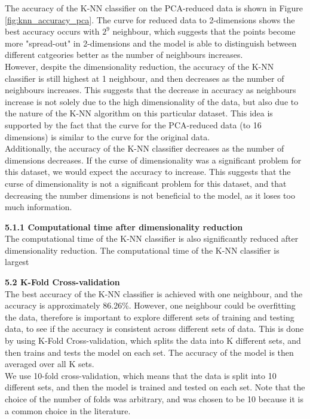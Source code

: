 \documentclass[12pt]{article}
\begin{document}
The accuracy of the K-NN classifier on the PCA-reduced data is shown in Figure \ref{fig:knn_accuracy_pca}. 
The curve for reduced data to 2-dimensions shows the best accuracy occurs with $2^9$ neighbour, which suggests that the points become more "spread-out" in 2-dimensions and the model is able to distinguish between different catgeories better as the number of neighbours increases. 
\\
However, despite the dimensionality reduction, the accuracy of the K-NN classifier is still highest at 1 neighbour, and then decreases as the number of neighbours increases. This suggests that the decrease in accuracy as neighbours increase is not solely due to the high dimensionality of the data, but also due to the nature of the K-NN algorithm on this particular dataset. This idea is supported by the fact that the curve for the PCA-reduced data (to 16 dimensions) is similar to the curve for the original data. 
\\
Additionally, the accuracy of the K-NN classifier decreases as the number of dimensions decreases. If the curse of dimensionality was a significant problem for this dataset, we would expect the accuracy to increase. This suggests that the curse of dimensionality is not a significant problem for this dataset, and that decreasing the number dimensions is not beneficial to the model, as it loses too much information.

\textbf{5.1.1 Computational time after dimensionality reduction}
\\
The computational time of the K-NN classifier is also significantly reduced after dimensionality reduction. The computational time of the K-NN classifier is largest

\vspace{20pt}

\textbf{5.2 K-Fold Cross-validation}
\\ 
The best accuracy of the K-NN classifier is achieved with one neighbour, and the accuracy is approximately 86.26\%. However, one neighbour could be overfitting the data, therefore is important to explore different sets of training and testing data, to see if the accuracy is consistent across different sets of data. This is done by using K-Fold Cross-validation, which splits the data into K different sets, and then trains and tests the model on each set. The accuracy of the model is then averaged over all K sets. 
\\
We use 10-fold cross-validation, which means that the data is split into 10 different sets, and then the model is trained and tested on each set. Note that the choice of the number of folds was arbitrary, and was chosen to be 10 because it is a common choice in the literature.
\\
\end{document}
